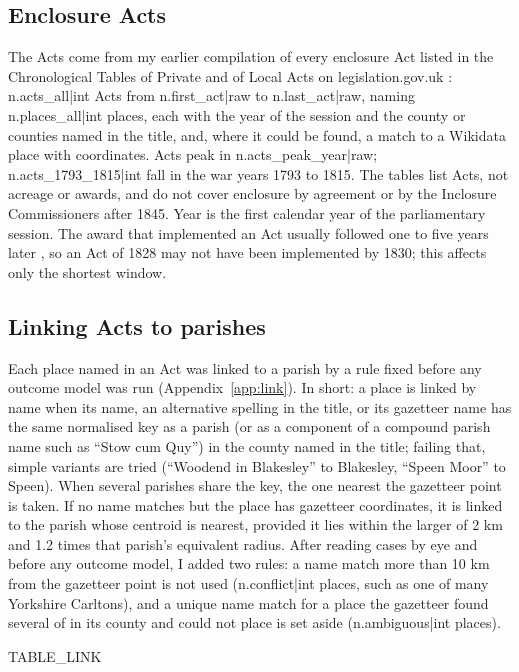 \documentclass[11pt,a4paper]{article}
\begin{document}
\subsection{Enclosure Acts}
The Acts come from my earlier compilation of every enclosure Act listed in the Chronological Tables of Private and of Local Acts on legislation.gov.uk \citep{hotham2026enclosure}: {{n.acts_all|int}} Acts from {{n.first_act|raw}} to {{n.last_act|raw}}, naming {{n.places_all|int}} places, each with the year of the session and the county or counties named in the title, and, where it could be found, a match to a Wikidata place with coordinates. Acts peak in {{n.acts_peak_year|raw}}; {{n.acts_1793_1815|int}} fall in the war years 1793 to 1815. The tables list Acts, not acreage or awards, and do not cover enclosure by agreement or by the Inclosure Commissioners after 1845. Year is the first calendar year of the parliamentary session. The award that implemented an Act usually followed one to five years later \citep{turner1980}, so an Act of 1828 may not have been implemented by 1830; this affects only the shortest window.

\subsection{Linking Acts to parishes}
Each place named in an Act was linked to a parish by a rule fixed before any outcome model was run (Appendix~\ref{app:link}). In short: a place is linked by name when its name, an alternative spelling in the title, or its gazetteer name has the same normalised key as a parish (or as a component of a compound parish name such as ``Stow cum Quy'') in the county named in the title; failing that, simple variants are tried (``Woodend in Blakesley'' to Blakesley, ``Speen Moor'' to Speen). When several parishes share the key, the one nearest the gazetteer point is taken. If no name matches but the place has gazetteer coordinates, it is linked to the parish whose centroid is nearest, provided it lies within the larger of 2 km and 1.2 times that parish's equivalent radius. After reading cases by eye and before any outcome model, I added two rules: a name match more than 10 km from the gazetteer point is not used ({{n.conflict|int}} places, such as one of many Yorkshire Carltons), and a unique name match for a place the gazetteer found several of in its county and could not place is set aside ({{n.ambiguous|int}} places).

{{TABLE_LINK}}
\end{document}
